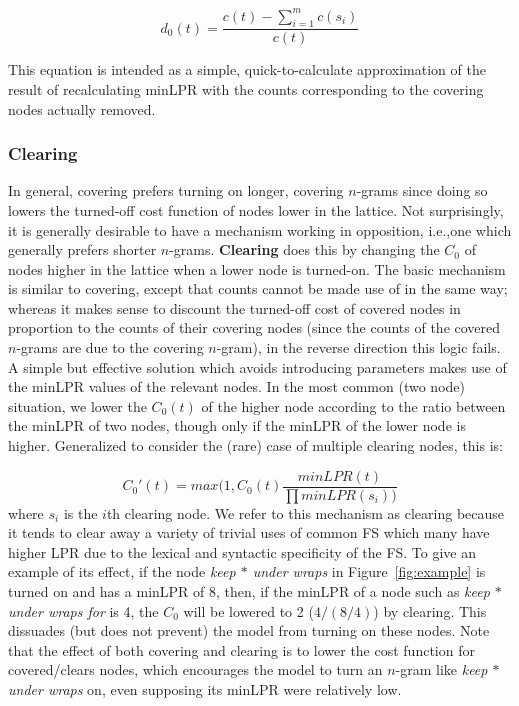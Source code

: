\documentclass[11pt,letterpaper]{article}
\makeatletter
\def \ie {i.e.,\@ }
\newcommand{\gap}{$*$\xspace}
\newcommand{\ex}[1]{\textit{#1}\xspace}
\newcommand{\termdef}[1]{\textbf{#1}\xspace}
\newcommand{\figref}[2][]{Figure#1~\ref{#2}\xspace}
\makeatother
\begin{document}
\begin{displaymath}
d_{0}(t) = \frac{c(t) - \sum_{i=1}^{m}{c(s_i)}}{c(t)}
\end{displaymath}

\noindent
This equation is intended as a simple, quick-to-calculate approximation of the result of recalculating minLPR with the counts corresponding to the covering nodes actually removed.

\subsubsection{Clearing}

In general, covering prefers turning on longer, covering $n$-grams since doing so lowers the turned-off cost function of nodes lower in the lattice. Not surprisingly, it is generally desirable to have a mechanism working in opposition, \ie one which generally prefers shorter $n$-grams. \termdef{Clearing} does this by changing the $C_0$ of nodes higher in the lattice when a lower node is turned-on. The basic mechanism is similar to covering, except that counts cannot be made use of in the same way; whereas it makes sense to discount the turned-off cost of covered nodes in proportion to the counts of their covering nodes (since the counts of the covered $n$-grams are due to the covering $n$-gram), in the reverse direction this logic fails. A simple but effective solution which avoids introducing parameters makes use of the minLPR values of the relevant nodes. In the most common (two node) situation, we lower the  $C_{0}(t)$ of the higher node according to the ratio between the minLPR of two nodes, though only if the minLPR of the lower node is higher. Generalized to consider the (rare) case of multiple clearing nodes, this is:


\begin{displaymath}
C_{0}'(t) = max(1, C_{0}(t) \frac{minLPR(t)}{\prod{minLPR(s_i)})}
\end{displaymath}
where $s_i$ is the $i$th clearing node. We refer to this mechanism as clearing because it tends to clear away a variety of trivial uses of common FS which many have higher LPR due to the lexical and syntactic specificity of the FS. To give an example of its effect, if the node \ex{keep \gap under wraps} in \figref{fig:example} is turned on and has a minLPR of 8, then, if the minLPR of a node such as \ex{keep \gap under wraps for} is 4, the $C_{0}$ will be lowered to 2 ($4/(8/4)$) by clearing. This dissuades (but does not prevent) the model from turning on these nodes. Note that the effect of both covering and clearing is to lower the cost function for covered/clears nodes, which encourages the model to turn an $n$-gram like \ex{keep \gap under wraps} on, even supposing its minLPR were relatively low.
\end{document}
